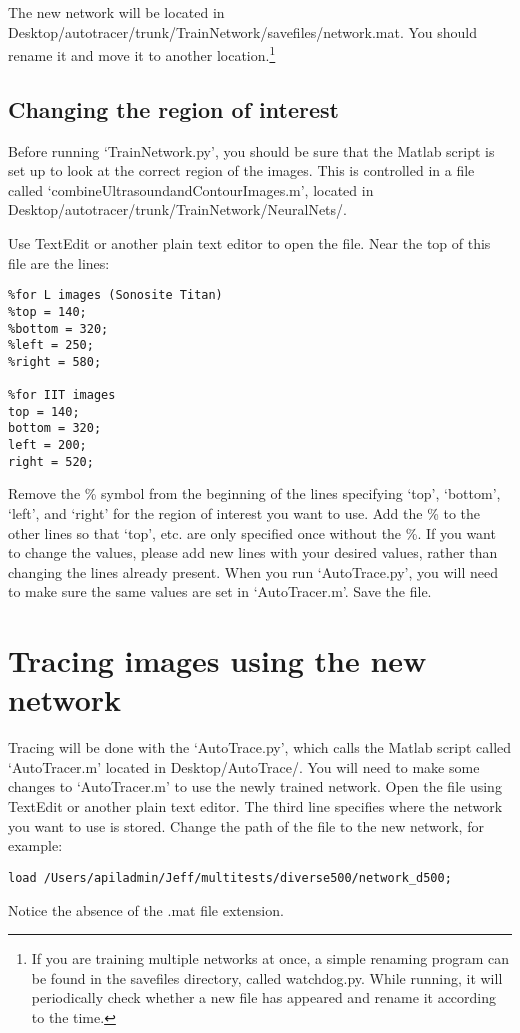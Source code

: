 \documentclass{article}
\begin{document}
The new network will be located in Desktop/autotracer/trunk/TrainNetwork/savefiles/network.mat. You should rename it and move it to another location.\footnote{If you are training multiple networks at once, a simple renaming program can be found in the savefiles directory, called watchdog.py. While running, it will periodically check whether a new file has appeared and rename it according to the time.}

\subsection{Changing the region of interest}
Before running `TrainNetwork.py', you should be sure that the Matlab script is set up to look at the correct region of the images. This is controlled in a file called `combineUltrasoundandContourImages.m', located in Desktop/autotracer/trunk/TrainNetwork/NeuralNets/. 

Use TextEdit or another plain text editor to open the file. Near the top of this file are the lines:
\begin{verbatim}
%for L images (Sonosite Titan)
%top = 140;
%bottom = 320;
%left = 250;
%right = 580;

%for IIT images
top = 140;
bottom = 320;
left = 200;
right = 520;
\end{verbatim}
Remove the \% symbol from the beginning of the lines specifying `top', `bottom', `left', and `right' for the region of interest you want to use. Add the \% to the other lines so that `top', etc. are only specified once without the \%. If you want to change the values, please add new lines with your desired values, rather than changing the lines already present. When you run `AutoTrace.py', you will need to make sure the same values are set in `AutoTracer.m'. Save the file. 

\section{Tracing images using the new network}
Tracing will be done with the `AutoTrace.py', which calls the Matlab script called `AutoTracer.m' located in Desktop/AutoTrace/. You will need to make some changes to `AutoTracer.m' to use the newly trained network. Open the file using TextEdit or another plain text editor. The third line specifies where the network you want to use is stored. Change the path of the file to the new network, for example:
\begin{verbatim}
load /Users/apiladmin/Jeff/multitests/diverse500/network_d500;	
\end{verbatim}
Notice the absence of the .mat file extension. 
\end{document}
